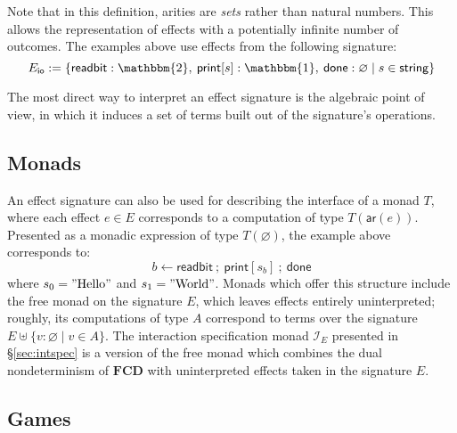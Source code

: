 \documentclass[draft,11pt]{report}
\newcommand{\kw}[1]{\ensuremath{ \mathsf{#1} }}
\begin{document}
Note that in this definition,
arities are \emph{sets} rather than natural numbers.
This allows the representation of effects
with a potentially infinite number of outcomes.
The examples above
use effects from the following signature:
\[
  E_\kw{io} :=
  \{ \kw{readbit} : \mathbbm{2}, \:
     \kw{print}[s] : \mathbbm{1}, \:
     \kw{done} : \varnothing \mid
     s \in \kw{string} \}
\]

The most direct way to interpret an effect signature
is the algebraic point of view,
in which it induces a set of terms
built out of the signature's operations.

\subsection{Monads}

An effect signature can also be used
for describing the interface of a monad $T$,
where each effect $e \in E$ corresponds to
a computation of type $T(\kw{ar}(e))$.
Presented as a monadic expression of type $T(\varnothing)$,
the example above corresponds to:
\[
  b \leftarrow \kw{readbit} \: ; \:
  \kw{print}[s_b] \: ; \:
  \kw{done}
\]
where $s_0 = "\text{Hello}"$ and $s_1 = "\text{World}"$.
Monads which offer this structure
include the free monad on the signature $E$,
which leaves effects entirely uninterpreted;
roughly, its computations of type $A$
correspond to terms over the signature
$E \uplus \{ v : \varnothing \mid v \in A \}$.
The interaction specification monad $\mathcal{I}_E$
presented in \S\ref{sec:intspec} is a version of the free monad
which combines the dual nondeterminism of $\mathbf{FCD}$ with
uninterpreted effects taken in the signature $E$.

\subsection{Games}
\end{document}
